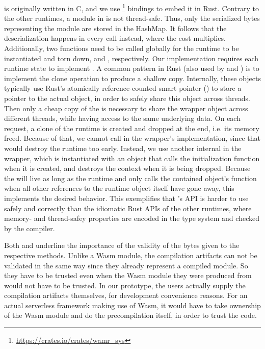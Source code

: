 \begin{description}[style=multiline, leftmargin=2.5cm, font=\bfseries]
    \item[Wamr]  is originally written in C, and we use \footnote{\url{https://crates.io/crates/wamr\_sys}} bindings to embed it in Rust. Contrary to the other runtimes, a module in  is not thread-safe. Thus, only the serialized bytes representing the module are stored in the HashMap. It follows that the deserialization happens in every  call instead, where the cost multiplies.
    Additionally, two functions need to be called globally for the runtime to be instantiated and torn down,  and , respectively.
    Our implementation requires each runtime state to implement . A common pattern in Rust (also used by  and ) is to implement the clone operation to produce a shallow copy. Internally, these objects typically use Rust's atomically reference-counted smart pointer () to store a pointer to the actual object, in order to safely share this object across threads. Then only a cheap copy of the  is necessary to share the wrapper object across different threads, while having access to the same underlying data. On each request, a clone of the runtime is created and dropped at the end, i.e. its memory freed. Because of that, we cannot call  in the wrapper's  implementation, since that would destroy the runtime too early. Instead, we use another internal  in the wrapper, which is instantiated with an object that calls the initialization function when it is created, and destroys the context when it is being dropped. Because the  will live as long as the runtime and only calls the contained object's  function when all other references to the runtime object itself have gone away, this implements the desired behavior.
    This exemplifies that 's API is harder to use safely and correctly than the idiomatic Rust APIs of the other runtimes, where memory- and thread-safey properties are encoded in the type system and checked by the compiler.

\end{description}

Both  and  underline the importance of the validity of the bytes given to the respective  methods. Unlike a Wasm module, the compilation artifacts can not be validated in the same way since they already represent a compiled module. So they have to be trusted even when the Wasm module they were produced from would not have to be trusted. In our prototype, the users actually supply the compilation artifacts themselves, for development convenience reasons. For an actual serverless framework making use of Wasm, it would have to take ownership of the Wasm module and do the precompilation itself, in order to trust the code.


